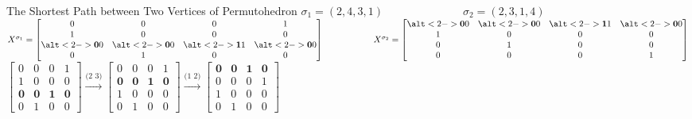 \documentclass{beamer}
\theoremstyle{plain}
\theoremstyle{definition}
\begin{document}
\begin{frame}{The Shortest Path between Two Vertices of Permutohedron}
    $\sigma_1 = (2,4,3,1) \hspace{3cm} \sigma_2 = (2,3,1,4)$ \\ \vspace{0.3cm}
    $X^{\sigma_1} = \begin{bmatrix}
        0 & 0 & 0 & 1 \\ 1 & 0 & 0 & 0 \\ \alt<2->{\mathbf{0}}{0} & \alt<2->{\mathbf{0}}{0} & \alt<2->{\mathbf{1}}{1} & \alt<2->{\mathbf{0}}{0} \\ 0 & 1 & 0 & 0
    \end{bmatrix} \hspace{2cm} X^{\sigma_2} = \begin{bmatrix}
        \alt<2->{\mathbf{0}}{0} & \alt<2->{\mathbf{0}}{0} & \alt<2->{\mathbf{1}}{1} & \alt<2->{\mathbf{0}}{0} \\ 1 & 0 & 0 & 0 \\ 0 & 1 & 0 & 0 \\ 0 & 0 & 0 & 1
    \end{bmatrix} $ \\ \vspace{0.3cm}
     { 
    $\begin{bmatrix}
        0 & 0 & 0 & 1 \\ 1 & 0 & 0 & 0 \\ \textbf{0} & \textbf{0} & \textbf{1} & \textbf{0} \\ 0 & 1 & 0 & 0 
        \end{bmatrix} \stackrel{\text{(2 3)}}{\longrightarrow} \begin{bmatrix}
        0 & 0 & 0 & 1 \\ \textbf{0} & \textbf{0} & \textbf{1} & \textbf{0} \\ 1 & 0 & 0 & 0 \\ 0 & 1 & 0 & 0
        \end{bmatrix} \stackrel{\text{(1 2)}}{\longrightarrow} 
        \begin{bmatrix}
        \textbf{0} & \textbf{0} & \textbf{1} & \textbf{0} \\ 0 & 0 & 0 & 1  \\ 1 & 0 & 0 & 0 \\ 0 & 1 & 0 & 0
        \end{bmatrix}$
    }
    
    
    
\end{frame}
\end{document}
